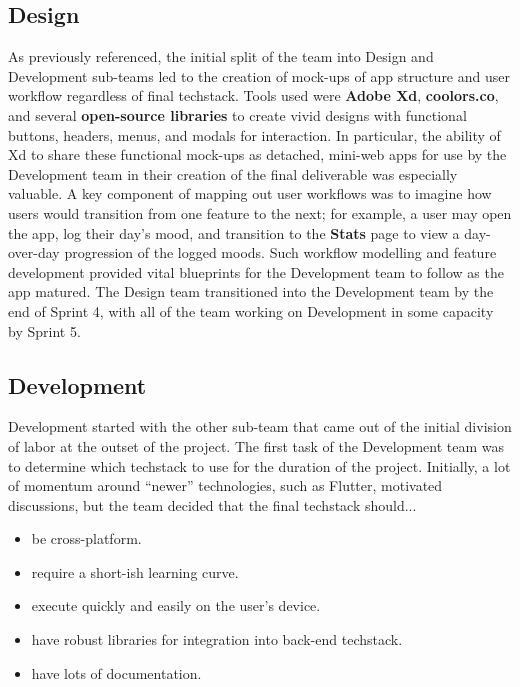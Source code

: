 \documentclass[10pt,american english]{article}
\begin{document}
\subsection*{Design}
As previously referenced, the initial split of the team into Design and Development sub-teams led to the creation of mock-ups of app structure and user workflow regardless of final techstack. Tools used were \textbf{Adobe Xd}, \textbf{coolors.co}, and several \textbf{open-source libraries} to create vivid designs with functional buttons, headers, menus, and modals for interaction. In particular, the ability of Xd to share these functional mock-ups as detached, mini-web apps for use by the Development team in their creation of the final deliverable was especially valuable. A key component of mapping out user workflows was to imagine how users would transition from one feature to the next; for example, a user may open the app, log their day's mood, and transition to the \textbf{Stats} page to view a day-over-day progression of the logged moods. Such workflow modelling and feature development provided vital blueprints for the Development team to follow as the app matured. The Design team transitioned into the Development team by the end of Sprint 4, with all of the team working on Development in some capacity by Sprint 5.

\subsection*{Development}
Development started with the other sub-team that came out of the initial division of labor at the outset of the project. The first task of the Development team was to determine which techstack to use for the duration of the project. Initially, a lot of momentum around ``newer'' technologies, such as Flutter, motivated discussions, but the team decided that the final techstack should...
 \begin{itemize}
\item be cross-platform.
\item require a short-ish learning curve.
\item execute quickly and easily on the user's device.
\item have robust libraries for integration into back-end techstack.
\item have lots of documentation.
\end{itemize}
\end{document}
